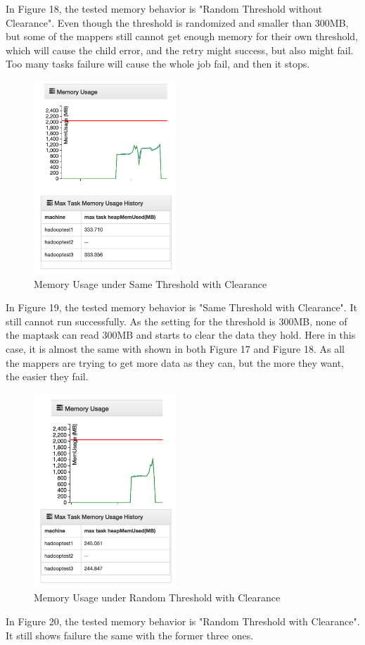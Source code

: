 In Figure 18, the tested memory behavior is "Random Threshold without Clearance". Even though the threshold is randomized and smaller than 300MB, but some of the mappers still cannot get enough memory for their own threshold, which will cause the child error, and the retry might success, but also might fail. Too many tasks failure will cause the whole job fail, and then it stops.

\begin{figure}[ht]
  \centering
    \includegraphics[width=2.1in]{image/test3c.png}
    \caption{Memory Usage under Same Threshold with Clearance}
    \label{ref:test3c}
\end{figure}

In Figure 19, the tested memory behavior is "Same Threshold with Clearance". It still cannot run successfully. As the setting for the threshold is 300MB, none of the maptask can read 300MB and starts to clear the data they hold. Here in this case, it is almost the same with shown in both Figure 17 and Figure 18. As all the mappers are trying to get more data as they can, but the more they want, the easier they fail.

\begin{figure}[ht]
  \centering
    \includegraphics[width=2.1in]{image/test3d.png}
    \caption{Memory Usage under Random Threshold with Clearance}
    \label{ref:test3d}
\end{figure}

In Figure 20, the tested memory behavior is "Random Threshold with Clearance". It still shows failure the same with the former three ones. 